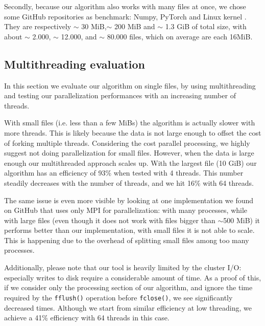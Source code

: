 Secondly, because our algorithm also works with many files at once, we chose some GitHub repositories as benchmark: Numpy\cite{2020NumPy-Array}, PyTorch \cite{Paszke_PyTorch_An_Imperative_2019} and Linux kernel \cite{linux}. They are respectively $\sim$ 30 MiB,$\sim$ 200 MiB and $\sim$ 1.3 GiB of total size, with about $\sim$ 2.000, $\sim$ 12.000, and  $\sim$ 80.000 files, which on average are each 16MiB.



\subsection{Multithreading evaluation}
In this section we evaluate our algorithm on single files, by using multithreading and testing our parallelization performances with an increasing number of threads.

With small files (i.e. less than a few MiBs) the algorithm is actually slower with more threads. This is likely because the data is not large enough to offset the cost of forking multiple threads. Considering the cost parallel processing, we highly suggest not doing parallelization for small files. However, when the data is large enough our multithreaded approach scales up. With the largest file (10 GiB) our algorithm has an efficiency of 93\% when tested with 4 threads. This number steadily decreases with the number of threads, and we hit 16\% with 64 threads.

The same issue is even more visible by looking at one implementation we found on GitHub that uses only MPI for parallelization\cite{HuffmanCodingMPICUDA}: with many processes, while with large files (even though it does not work with files bigger than $\sim$500 MiB) it performs better than our implementation, with small files it is not able to scale. This is happening due to the overhead of splitting small files among too many processes.

Additionally, please note that our tool is heavily limited by the cluster I/O: especially writes to disk require a considerable amount of time. As a proof of this, if we consider only the processing section of our algorithm, and ignore the time required by the \verb|fflush()| operation before \verb|fclose()|, we see significantly decreased times. Although we start from similar efficiency at low threading, we achieve a 41\% efficiency with 64 threads in this case. %

